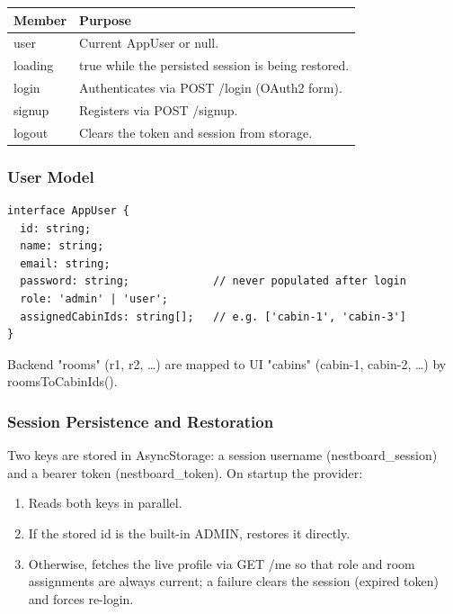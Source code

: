 \documentclass[11pt,a4paper]{article}
\newcommand{\code}[1]{\colorbox{codebg}{\ttfamily\small #1}}
\begin{document}
\begin{longtable}{@{}p{}p{}@{}}
  \toprule
  \textbf{Member} & \textbf{Purpose} \\
  \midrule
  \endhead
  \code{user}    & Current \code{AppUser} or \code{null}. \\
  \code{loading} & \code{true} while the persisted session is being restored. \\
  \code{login}   & Authenticates via \code{POST /login} (OAuth2 form). \\
  \code{signup}  & Registers via \code{POST /signup}. \\
  \code{logout}  & Clears the token and session from storage. \\
  \bottomrule
\end{longtable}

\subsubsection{User Model}

\begin{lstlisting}[language=tsx]
interface AppUser {
  id: string;
  name: string;
  email: string;
  password: string;             // never populated after login
  role: 'admin' | 'user';
  assignedCabinIds: string[];   // e.g. ['cabin-1', 'cabin-3']
}
\end{lstlisting}

Backend "rooms" (\code{r1}, \code{r2}, \ldots) are mapped to UI "cabins"
(\code{cabin-1}, \code{cabin-2}, \ldots) by \code{roomsToCabinIds()}.

\subsubsection{Session Persistence and Restoration}

Two keys are stored in AsyncStorage: a session username
(\code{nestboard\_session}) and a bearer token (\code{nestboard\_token}). On
startup the provider:

\begin{enumerate}[leftmargin=1.5em]
  \item Reads both keys in parallel.
  \item If the stored id is the built-in \code{ADMIN}, restores it directly.
  \item Otherwise, fetches the live profile via \code{GET /me} so that role and
        room assignments are always current; a failure clears the session
        (expired token) and forces re-login.
\end{enumerate}
\end{document}

